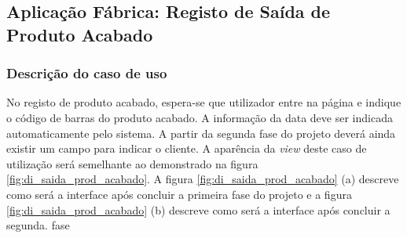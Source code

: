 \subsection{Aplicação Fábrica: Registo de Saída de Produto Acabado}
\subsubsection*{Descrição do caso de uso}
No registo de produto acabado, espera-se que utilizador entre na página e indique o código de barras do produto acabado. A informação da data deve ser indicada automaticamente pelo sistema. A partir da segunda fase do projeto deverá ainda existir um campo para indicar o cliente. A aparência da \textit{view} deste caso de utilização será semelhante ao demonstrado na figura \ref{fig:di_saida_prod_acabado}. A figura  \ref{fig:di_saida_prod_acabado} (a) descreve como será a interface após concluir a primeira fase do projeto e a figura  \ref{fig:di_saida_prod_acabado} (b) descreve como será a interface após concluir a segunda. fase

